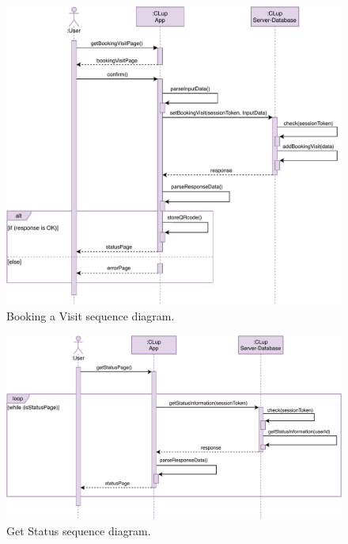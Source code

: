\begin{figure}[H]
    \centering
    \includegraphics[width=1.0\textwidth]{images/bookingVisit_sequence_diagram.pdf}
    \caption{Booking a Visit sequence diagram.}
\end{figure}

\begin{figure}[H]
    \centering
    \includegraphics[width=1.0\textwidth]{images/getStatusPage_sequence_diagram.pdf}
    \caption{Get Status sequence diagram.}
\end{figure}

